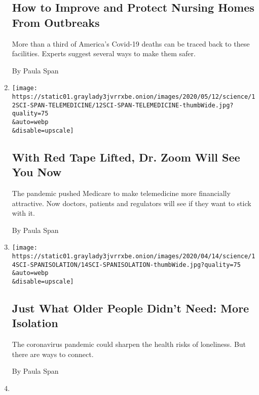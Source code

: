 \begin{enumerate}
{  \subsection{How to Improve and Protect Nursing Homes From
  Outbreaks}\label{how-to-improve-and-protect-nursing-homes-from-outbreaks}}

  More than a third of America's Covid-19 deaths can be traced back to
  these facilities. Experts suggest several ways to make them safer.

  By Paula Span
\item
  \href{/2020/05/08/health/coronavirus-telemedicine-seniors.html}{}

  \texttt{[image: https://static01.graylady3jvrrxbe.onion/images/2020/05/12/science/12SCI-SPAN-TELEMEDICINE/12SCI-SPAN-TELEMEDICINE-thumbWide.jpg?quality=75\\\&auto=webp\\\&disable=upscale]}

  \hypertarget{with-red-tape-lifted-dr-zoom-will-see-you-now}{%
  \subsection{With Red Tape Lifted, Dr. Zoom Will See You
  Now}\label{with-red-tape-lifted-dr-zoom-will-see-you-now}}

  The pandemic pushed Medicare to make telemedicine more financially
  attractive. Now doctors, patients and regulators will see if they want
  to stick with it.

  By Paula Span
\item
  \href{/2020/04/13/health/coronavirus-elderly-isolation-loneliness.html}{}

  \texttt{[image: https://static01.graylady3jvrrxbe.onion/images/2020/04/14/science/14SCI-SPANISOLATION/14SCI-SPANISOLATION-thumbWide.jpg?quality=75\\\&auto=webp\\\&disable=upscale]}

  \hypertarget{just-what-older-people-didnt-need-more-isolation}{%
  \subsection{Just What Older People Didn't Need: More
  Isolation}\label{just-what-older-people-didnt-need-more-isolation}}

  The coronavirus pandemic could sharpen the health risks of loneliness.
  But there are ways to connect.

  By Paula Span
\item
  \href{/2020/03/27/well/elderly-romance-scam.html}{}


\end{enumerate}
